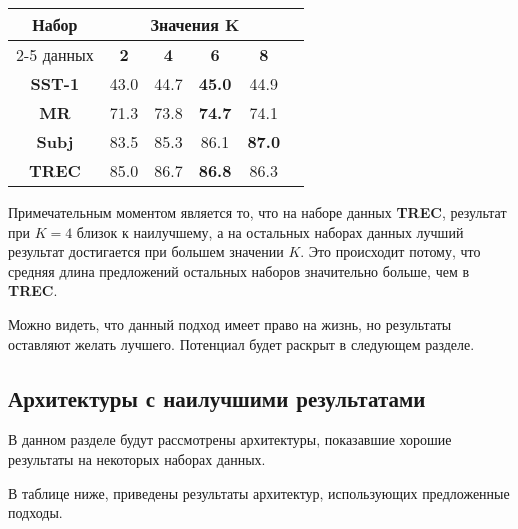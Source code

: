 \vspace{5mm}
\begin{minipage}{\linewidth}
 \label{tab:title} 
\begin{tabular}{|c|c|c|c|c|c|}
\hline
\multirow{2}{*}{Набор}   &  \multicolumn{4}{c|}{Значения K} \\ \cline{2-5} 
     данных              &  \textbf{2}  & \textbf{4}   & \textbf{6} & \textbf{8} \\ \hline
\textbf{SST-1}           & 43.0      &  44.7 & \textbf{45.0}     & 44.9     \\ \hline
\textbf{MR}              & 71.3      & 73.8  & \textbf{74.7}     & 74.1     \\ \hline
\textbf{Subj}            & 83.5      & 85.3  & 86.1              & \textbf{87.0} \\ \hline
\textbf{TREC}            & 85.0      & 86.7  & \textbf{86.8}     & 86.3     \\ \hline
\end{tabular}
\end{minipage}
\vspace{5mm}

Примечательным моментом является то, что на наборе данных \textbf{TREC}, результат при $K=4$ близок к наилучшему, а на остальных наборах данных лучший результат достигается при большем значении $K$.
Это происходит потому, что средняя длина предложений остальных наборов значительно больше, чем в \textbf{TREC}.

Можно видеть, что данный подход имеет право на жизнь, но результаты оставляют желать лучшего.
Потенциал  будет раскрыт в следующем разделе.

\subsection{Архитектуры с наилучшими результатами}

В данном разделе будут рассмотрены архитектуры, показавшие хорошие результаты на некоторых наборах данных.

В таблице ниже, приведены результаты архитектур, использующих предложенные подходы.

